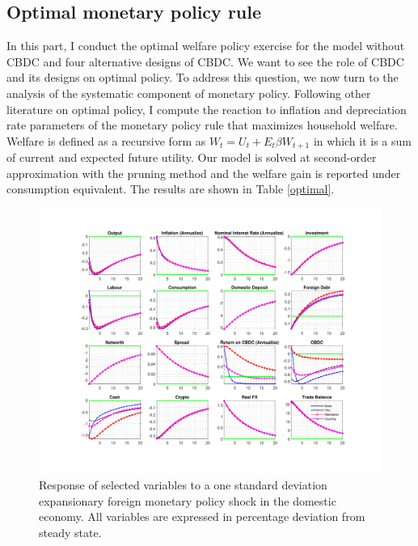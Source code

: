 \documentclass[12pt, a4paper]{article}
\begin{document}
\subsection{Optimal monetary policy rule}

In this part, I conduct the optimal welfare policy exercise for the model without CBDC and four alternative designs of CBDC. We want to see the role of CBDC and its designs on optimal policy. To address this question, we now turn to the analysis of the systematic component of monetary policy. Following other literature on optimal policy, I compute the reaction to inflation and depreciation rate parameters of the monetary policy rule that maximizes household welfare. Welfare is defined as a recursive form as $W_t= U_t +E_t \beta W_{t+1} $ in which it is a sum of current and expected future utility. Our model is solved at second-order approximation with the pruning method and the welfare gain is reported under consumption equivalent. The results are shown in Table \ref{optimal}.


\begin{figure}[H]
  \hspace{-0.7cm}
	\centering
	\centerline{\includegraphics[trim = 0mm 23mm 0mm 18mm, clip, scale=0.97]{foreign_alt.pdf}}
	\caption{Response of selected variables to a one standard deviation expansionary foreign monetary policy shock in the domestic economy. All variables are expressed in percentage deviation from steady state.}
	\label{foralt}
\end{figure}
\end{document}
